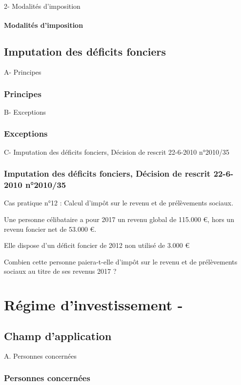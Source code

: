 				2- Modalités d'imposition
				\paragraph{Modalités d'imposition}


	\subsection{Imputation des déficits fonciers}

			A- Principes
		\subsubsection{Principes}

		B- Exceptions
		\subsubsection{Exceptions}

		C- Imputation des déficits fonciers, Décision de rescrit 22-6-2010 				n°2010/35
		\subsubsection{Imputation des déficits fonciers, Décision de rescrit 22-6-2010 				n°2010/35}


		Cas pratique n°12 : Calcul d’impôt sur le revenu et de prélèvements sociaux.

		Une personne célibataire a pour 2017 un revenu global de 115.000 €, hors un revenu foncier net de 53.000 €.

		Elle dispose d’un déficit foncier de 2012 non utilisé de 3.000 €

		Combien cette personne paiera-t-elle d’impôt sur le revenu et de prélèvements sociaux au titre de ses revenus 2017 ?


\section{Régime d’investissement  - }

	\subsection{Champ d’application}

A. Personnes concernées
		\subsubsection{Personnes concernées}


